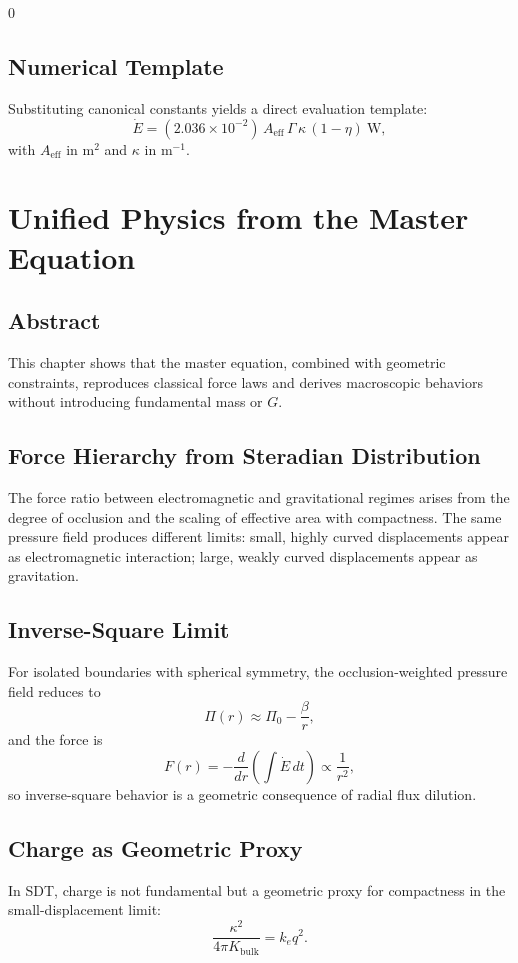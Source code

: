 0\documentclass[12pt]{book}
\begin{document}
\section{Numerical Template}
Substituting canonical constants yields a direct evaluation template:
\begin{equation}
\dot{E} = (2.036\times 10^{-2})\,A_{\text{eff}}\,\Gamma\,\kappa\,(1-\eta)\ \text{W},
\end{equation}
with $A_{\text{eff}}$ in $\text{m}^2$ and $\kappa$ in $\text{m}^{-1}$.

\chapter{Unified Physics from the Master Equation}

\section*{Abstract}
This chapter shows that the master equation, combined with geometric constraints, reproduces classical
force laws and derives macroscopic behaviors without introducing fundamental mass or $G$.

\section{Force Hierarchy from Steradian Distribution}
The force ratio between electromagnetic and gravitational regimes arises from the degree of occlusion
and the scaling of effective area with compactness. The same pressure field produces different limits:
small, highly curved displacements appear as electromagnetic interaction; large, weakly curved displacements
appear as gravitation.

\section{Inverse-Square Limit}
For isolated boundaries with spherical symmetry, the occlusion-weighted pressure field reduces to
\begin{equation}
\Pi(r) \approx \Pi_0 - \frac{\beta}{r},
\end{equation}
and the force is
\begin{equation}
F(r) = -\frac{d}{dr}\left(\int \dot{E}\, dt\right) \propto \frac{1}{r^2},
\end{equation}
so inverse-square behavior is a geometric consequence of radial flux dilution.

\section{Charge as Geometric Proxy}
In SDT, charge is not fundamental but a geometric proxy for compactness in the small-displacement limit:
\begin{equation}
\frac{\kappa^2}{4\pi K_{\text{bulk}}} = k_e q^2.
\end{equation}
\end{document}
